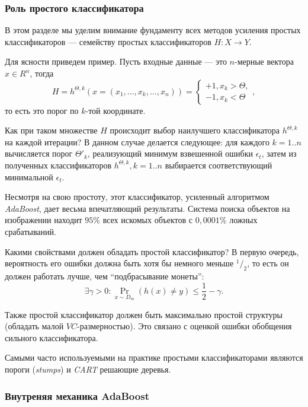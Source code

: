 \subsubsection{Роль простого классификатора}
В этом разделе мы уделим внимание фундаменту всех методов усиления простых классификаторов --- семейству простых классификаторов $H : X \to Y$.

Для ясности приведем пример. Пусть входные данные --- это $n$-мерные вектора $x \in R^n$, тогда
\begin{displaymath}
  H = h^{\Theta, k}(x = (x_1, \dots, x_k, \dots, x_n)) = \begin{cases}+1, x_k > \Theta,\\ -1, x_k < \Theta\end{cases},
\end{displaymath}
то есть это порог по $k$-той координате.

Как при таком множестве $H$ происходит выбор наилучшего классификатора $h^{\Theta, k}$ на каждой итерации? В данном случае делается следующее: для каждого $k = 1..n$ вычисляется порог $\Theta'_k$, реализующий минимум взвешенной ошибки $\epsilon_t$, затем из полученных классификаторов $h^{\Theta, k}, k = 1..n$ выбирается соответствующий минимальной $\epsilon_t$.

Несмотря на свою простоту, этот классификатор, усиленный алгоритмом \emph{AdaBoost}, дает весьма впечатляющий результаты. Система поиска объектов на изображении \cite{viola01} находит $95\%$ всех искомых объектов с $0,0001\%$ ложных срабатываний.

Какими свойствами должен обладать простой классификатор? В первую очередь, вероятность его ошибки должна быть хотя бы немного меньше $^1/_2$, то есть он должен работать лучше, чем ``подбрасывание монеты'':
\begin{displaymath}
  \exists \gamma > 0: \underset{x \sim D_m}{\Pr}(h(x) \neq y) \leq \frac{1}{2} - \gamma.
\end{displaymath}

Также простой классификатор должен быть максимально простой структуры (обладать малой $VC$-размерностью). Это связано с оценкой ошибки обобщения сильного классификатора.

Самыми часто используемыми на практике простыми классификаторами являются пороги (\emph{stumps}) и \emph{CART} решающие деревья.

\subsubsection{Внутреняя механика AdaBoost}


